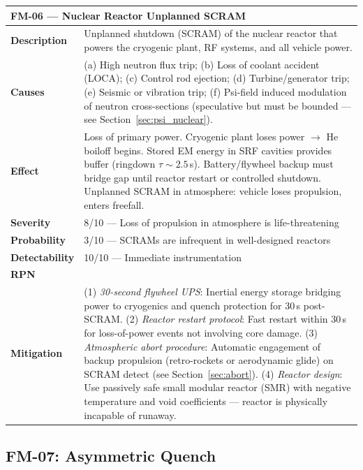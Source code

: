 \documentclass[11pt,a4paper]{article}
\newcommand{\Smed}[1]{\cellcolor{risk-medium!40}{#1}}
\begin{document}
\begin{longtable}{p{0.25\tw}p{0.65\tw}}
\toprule
\multicolumn{2}{l}{\textbf{FM-06 --- Nuclear Reactor Unplanned SCRAM}} \\
\midrule
\endhead
\textbf{Description} &
  Unplanned shutdown (SCRAM) of the nuclear reactor that powers
  the cryogenic plant, RF systems, and all vehicle power. \\[4pt]
\textbf{Causes} &
  (a) High neutron flux trip; (b) Loss of coolant accident (LOCA);
  (c) Control rod ejection; (d) Turbine/generator trip; (e) Seismic
  or vibration trip; (f) Psi-field induced modulation of neutron
  cross-sections (speculative but must be bounded --- see
  Section~\ref{sec:psi_nuclear}). \\[4pt]
\textbf{Effect} &
  Loss of primary power. Cryogenic plant loses power $\to$ He boiloff
  begins. Stored EM energy in SRF cavities provides buffer (ringdown
  $\tau \sim 2.5$\,s). Battery/flywheel backup must bridge gap until
  reactor restart or controlled shutdown. Unplanned SCRAM in
  atmosphere: vehicle loses propulsion, enters freefall. \\[4pt]
\textbf{Severity} & 8/10 --- Loss of propulsion in atmosphere is
  life-threatening \\[4pt]
\textbf{Probability} & 3/10 --- SCRAMs are infrequent in well-designed
  reactors \\[4pt]
\textbf{Detectability} & 10/10 --- Immediate instrumentation \\[4pt]
\textbf{RPN} & \Smed{$8 \times 3 \times (11-10) = 24$} \\[4pt]
\textbf{Mitigation} &
  (1) \textit{30-second flywheel UPS}: Inertial energy storage bridging
  power to cryogenics and quench protection for 30\,s post-SCRAM.
  (2) \textit{Reactor restart protocol}: Fast restart within $30$\,s
  for loss-of-power events not involving core damage.
  (3) \textit{Atmospheric abort procedure}: Automatic engagement of
  backup propulsion (retro-rockets or aerodynamic glide) on SCRAM
  detect (see Section~\ref{sec:abort}).
  (4) \textit{Reactor design}: Use passively safe small modular reactor
  (SMR) with negative temperature and void coefficients --- reactor
  is physically incapable of runaway. \\
\bottomrule
\end{longtable}

\subsection{FM-07: Asymmetric Quench}
\end{document}
